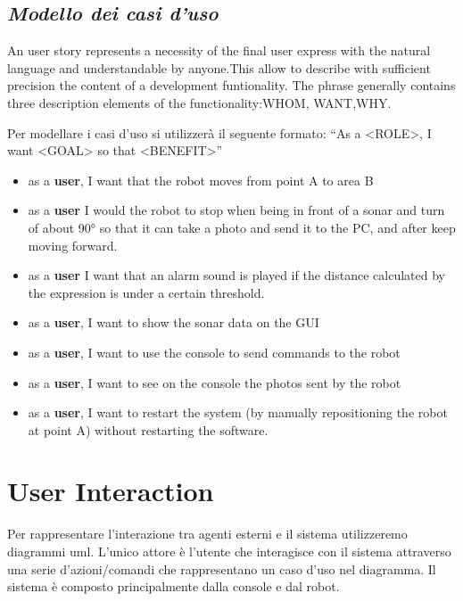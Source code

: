 \documentclass[a4paper]{article}
\begin{document}


\subsection {  \textit {Modello dei casi d’uso}}
An user story represents a necessity of the final user express with the natural language and understandable by anyone.This allow to describe with sufficient precision the content of a development funtionality. The phrase generally contains three description elements of the functionality:WHOM, WANT,WHY.

Per modellare i casi d’uso si utilizzerà il seguente formato:
“As a <ROLE>, I want <GOAL> so that <BENEFIT>”
\begin{itemize}
	\item as a \textbf{user}, I want that the robot moves from point A to area B
	\item as a \textbf{user} I would the robot to stop when being in front of a sonar and turn of about 90° so that it can take a photo and send it to the PC, and after keep moving forward.
	\item as a \textbf{user} I want that an alarm sound is played if the distance calculated by the expression is under a certain threshold.
	\item as a \textbf{user}, I want to show the sonar data on the GUI
	\item as a \textbf{user}, I want to use the console to send commands to the robot
	\item as a \textbf{user}, I want to see on the console the photos sent by the robot
	\item as a \textbf{user}, I want to restart the system (by manually repositioning the robot at point A) without restarting the software.
\end{itemize}

\section{User Interaction}
Per rappresentare l’interazione tra agenti esterni e il sistema utilizzeremo diagrammi uml.
L’unico attore è l’utente che interagisce con il sistema attraverso una serie d’azioni/comandi che rappresentano un caso d’uso nel diagramma. Il sistema è composto principalmente dalla console e dal robot. 
\end{document}
